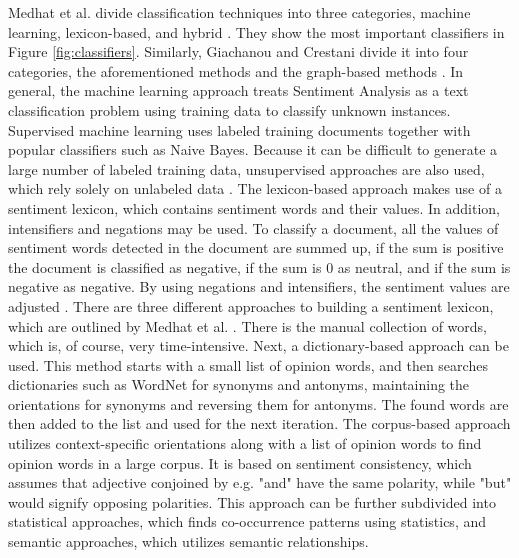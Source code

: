 Medhat et al. divide classification techniques into three categories, machine learning, lexicon-based, and hybrid \cite{MEDHAT20141093}. They show the most important classifiers in Figure \ref{fig:classifiers}. Similarly, Giachanou and Crestani divide it into four categories, the aforementioned methods and the graph-based methods \cite{DBLP:journals/csur/GiachanouC16}. In general, the machine learning approach treats Sentiment Analysis as a text classification problem using training data to classify unknown instances. Supervised machine learning uses labeled training documents together with popular classifiers such as Naive Bayes. Because it can be difficult to generate a large number of labeled training data, unsupervised approaches are also used, which rely solely on unlabeled data \cite{MEDHAT20141093}. The lexicon-based approach makes use of a sentiment lexicon, which contains sentiment words and their values. In addition, intensifiers and negations may be used. To classify a document, all the values of sentiment words detected in the document are summed up, if the sum is positive the document is classified as negative, if the sum is 0 as neutral, and if the sum is negative as negative. By using negations and intensifiers, the sentiment values are adjusted \cite{liu_2015}. There are three different approaches to building a sentiment lexicon, which are outlined by Medhat et al. \cite{MEDHAT20141093}. There is the manual collection of words, which is, of course, very time-intensive. Next, a dictionary-based approach can be used. This method starts with a small list of opinion words, and then searches dictionaries such as WordNet for synonyms and antonyms, maintaining the orientations for synonyms and reversing them for antonyms. The found words are then added to the list and used for the next iteration. The corpus-based approach utilizes context-specific orientations along with a list of opinion words to find opinion words in a large corpus. It is based on sentiment consistency, which assumes that adjective conjoined by e.g. "and" have the same polarity, while "but" would signify opposing polarities. This approach can be further subdivided into statistical approaches, which finds co-occurrence patterns using statistics, and semantic approaches, which utilizes semantic relationships.








